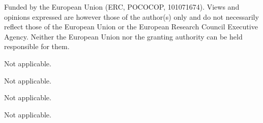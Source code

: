 \documentclass{amsart}
\numberwithin{equation}{section}
\theoremstyle{plain}
\theoremstyle{definition}
\begin{document}
Funded by the European Union (ERC, POCOCOP, 101071674). Views and opinions expressed are however those of the author(s) only and do not necessarily reflect those of the European Union or the European Research Council Executive Agency. Neither the European Union nor the granting authority can be held responsible for them.

 Not applicable.
\smallskip

 Not applicable. 
\smallskip

 Not applicable. 
\smallskip

 Not applicable. 

\fi
 
 
\end{document}
